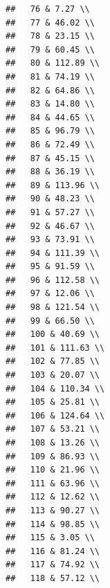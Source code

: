 \documentclass{article}\usepackage[]{graphicx}\usepackage[]{color}
\makeatletter
\newenvironment{kframe}{%
 \def\at@end@of@kframe{}%
 \ifinner\ifhmode%
  \def\at@end@of@kframe{\end{minipage}}%
  \begin{minipage}{\columnwidth}%
 \fi\fi%
 \def\FrameCommand##1{\hskip\@totalleftmargin \hskip-\fboxsep
 \colorbox{shadecolor}{##1}\hskip-\fboxsep
     \hskip-\linewidth \hskip-\@totalleftmargin \hskip\columnwidth}%
 \MakeFramed {\advance\hsize-\width
   \@totalleftmargin\z@ \linewidth\hsize
   \@setminipage}}%
 {\par\unskip\endMakeFramed%
 \at@end@of@kframe}
\newenvironment{knitrout}{}{} %
\makeatother
\begin{document}
\begin{knitrout}
\begin{kframe}
\begin{verbatim}
##   76 & 7.27 \\ 
##   77 & 46.02 \\ 
##   78 & 23.15 \\ 
##   79 & 60.45 \\ 
##   80 & 112.89 \\ 
##   81 & 74.19 \\ 
##   82 & 64.86 \\ 
##   83 & 14.80 \\ 
##   84 & 44.65 \\ 
##   85 & 96.79 \\ 
##   86 & 72.49 \\ 
##   87 & 45.15 \\ 
##   88 & 36.19 \\ 
##   89 & 113.96 \\ 
##   90 & 48.23 \\ 
##   91 & 57.27 \\ 
##   92 & 46.67 \\ 
##   93 & 73.91 \\ 
##   94 & 111.39 \\ 
##   95 & 91.59 \\ 
##   96 & 112.58 \\ 
##   97 & 12.06 \\ 
##   98 & 121.54 \\ 
##   99 & 66.50 \\ 
##   100 & 40.69 \\ 
##   101 & 111.63 \\ 
##   102 & 77.85 \\ 
##   103 & 20.07 \\ 
##   104 & 110.34 \\ 
##   105 & 25.81 \\ 
##   106 & 124.64 \\ 
##   107 & 53.21 \\ 
##   108 & 13.26 \\ 
##   109 & 86.93 \\ 
##   110 & 21.96 \\ 
##   111 & 63.96 \\ 
##   112 & 12.62 \\ 
##   113 & 90.27 \\ 
##   114 & 98.85 \\ 
##   115 & 3.05 \\ 
##   116 & 81.24 \\ 
##   117 & 74.92 \\ 
##   118 & 57.12 \\ 

\end{verbatim}
\end{kframe}
\end{knitrout}
\end{document}
